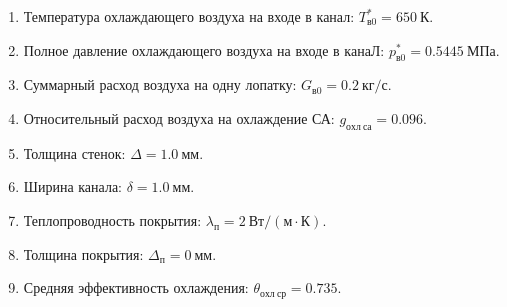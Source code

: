\documentclass[a4paper,10pt]{article}
\begin{document}
    
    \begin{enumerate}

        \item Температура охлаждающего воздуха на входе в канал:
            $ T_{в0}^{*} = 650\ К$.
        \item Полное давление охлаждающего воздуха на входе в канаЛ:
            $ p_{в0}^* = 0.5445\ МПа $.
        \item Суммарный расход воздуха на одну лопатку: $G_{в0} = 0.2\ кг/с$.
        \item Относительный расход воздуха на охлаждение СА:
            $g_{охл\ са} = 0.096$.
        \item Толщина стенок: $\Delta = 1.0\ мм$.
        \item Ширина канала: $\delta = 1.0\ мм$.
        \item Теплопроводность покрытия: $\lambda_п = 2\ Вт/(м \cdot К)$.
        \item Толщина покрытия: $\Delta_п = 0\ мм$.
        \item Средняя эффективность охлаждения: $\theta_{охл\ ср} = 0.735$.
    \end{enumerate}
    
\end{document}
